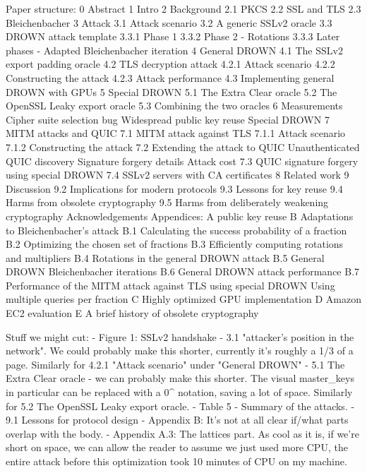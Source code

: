 \documentclass{article}
\begin{document}
Paper structure:
0 Abstract
1 Intro
2 Background
  2.1 PKCS
  2.2 SSL and TLS
  2.3 Bleichenbacher
3 Attack
  3.1 Attack scenario
  3.2 A generic SSLv2 oracle
  3.3 DROWN attack template
  3.3.1 Phase 1
  3.3.2 Phase 2 - Rotations
  3.3.3 Later phases - Adapted Bleichenbacher iteration
4 General DROWN
  4.1 The SSLv2 export padding oracle
  4.2 TLS decryption attack
    4.2.1 Attack scenario
    4.2.2 Constructing the attack
    4.2.3 Attack performance
  4.3 Implementing general DROWN with GPUs
5 Special DROWN
  5.1 The Extra Clear oracle
  5.2 The OpenSSL Leaky export oracle
  5.3 Combining the two oracles
6 Measurements
  Cipher suite selection bug
  Widespread public key reuse
  Special DROWN
7 MITM attacks and QUIC
  7.1 MITM attack against TLS
    7.1.1 Attack scenario
    7.1.2 Constructing the attack
  7.2 Extending the attack to QUIC
    Unauthenticated QUIC discovery
    Signature forgery details
    Attack cost
  7.3 QUIC signature forgery using special DROWN
  7.4 SSLv2 servers with CA certificates
8 Related work
9 Discussion
  9.2 Implications for modern protocols
  9.3 Lessons for key reuse
  9.4 Harms from obsolete cryptography
  9.5 Harms from deliberately weakening cryptography
Acknowledgements
Appendices:
A public key reuse
B Adaptations to Bleichenbacher’s attack
  B.1 Calculating the success probability of a fraction
  B.2 Optimizing the chosen set of fractions
  B.3 Efficiently computing rotations and multipliers
  B.4 Rotations in the general DROWN attack
  B.5 General DROWN Bleichenbacher iterations
  B.6 General DROWN attack performance
  B.7 Performance of the MITM attack against TLS using special DROWN
    Using multiple queries per fraction
C Highly optimized GPU implementation
D Amazon EC2 evaluation
E A brief history of obsolete cryptography

Stuff we might cut:
- Figure 1: SSLv2 handshake
- 3.1 "attacker's position in the network".
  We could probably make this shorter, currently it's roughly a 1/3 of a page.
  Similarly for 4.2.1 "Attack scenario" under "General DROWN"
- 5.1 The Extra Clear oracle - we can probably make this shorter.
  The visual master_keys in particular can be replaced with a 0^ notation, saving a lot of space.
  Similarly for 5.2 The OpenSSL Leaky export oracle.
- Table 5 - Summary of the attacks.
- 9.1 Lessons for protocol design
- Appendix B: It's not at all clear if/what parts overlap with the body.
- Appendix A.3: The lattices part.
  As cool as it is, if we're short on space, we can allow the reader to assume
  we just used more CPU, the entire attack before this optimization took 10
  minutes of CPU on my machine.
\end{document}
